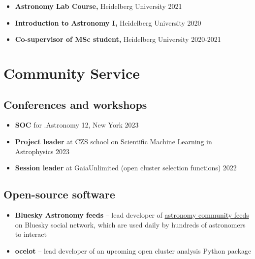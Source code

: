 \documentclass[12pt, letterpaper]{hunt-cv}
\begin{document}
\begin{itemize}
    \item \textbf{Astronomy Lab Course,} Heidelberg University \hfill 2021
    \item \textbf{Introduction to Astronomy I,} Heidelberg University \hfill 2020
    \item \textbf{Co-supervisor of MSc student,} Heidelberg University \hfill 2020-2021
\end{itemize}


\section*{Community Service}

\subsection*{Conferences and workshops}

\begin{itemize}
    \item \textbf{SOC} for .Astronomy 12, New York \hfill 2023
    \item \textbf{Project leader} at CZS school on Scientific Machine Learning in Astrophysics \hfill 2023
    \item \textbf{Session leader} at GaiaUnlimited (open cluster selection functions) \hfill 2022
\end{itemize}

\subsection*{Open-source software \href{\cvGitHubLink}{\faGithub}}

\begin{itemize}
    \item \textbf{Bluesky Astronomy feeds} -- lead developer of \href{https://github.com/emilyhunt/bluesky-astronomy-feeds}{astronomy community feeds} on Bluesky social network, which are used daily by hundreds of astronomers to interact
    \item \textbf{ocelot} -- lead developer of an upcoming open cluster analysis Python package
\end{itemize}


\end{document}
